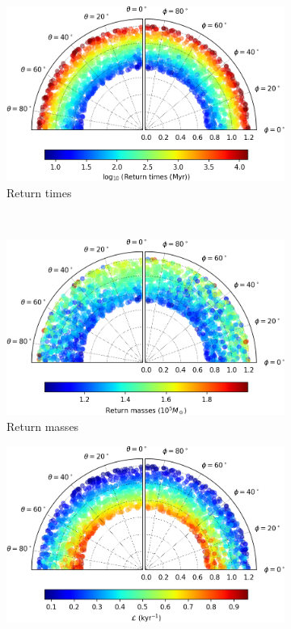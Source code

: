 \begin{figure}[h]
    \centering
    \begin{subfigure}[t]{0.4\textwidth}
        \includegraphics[width = \textwidth]{"../Files/Week 13/images/2_time"}
        \caption{Return times}
    \end{subfigure}
    ~ 
    \begin{subfigure}[t]{0.4\textwidth}
        \includegraphics[width=\textwidth]{"../Files/Week 13/images/2_mass"}
        \caption{Return masses}
    \end{subfigure}
    \begin{subfigure}[t]{0.4\textwidth}
        \includegraphics[width=\textwidth]{"../Files/Week 13/images/2_lyapunov"}

\end{subfigure}
\end{figure}
